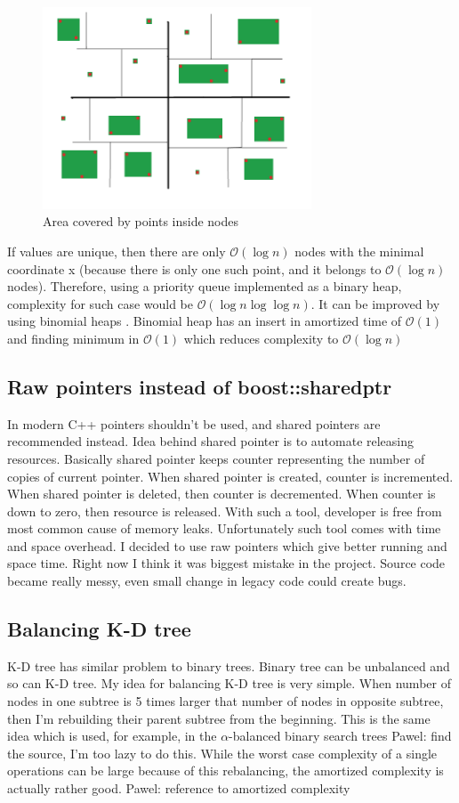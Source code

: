 \documentclass[10pt,a4paper]{article}
\newcommand{\pawel}[1]{\noindent\colorbox{myRed}{Pawel: #1}}
\newcommand{\Oh}{\mathcal{O}}
\begin{document}
\begin{figure}
\centering
  \includegraphics[width=8cm]{simple_boundary2.png}%
  \caption{Area covered by points inside nodes}
  \label{fig:inside}
\end{figure}

If values are unique, then there are only $\Oh(\log n)$ nodes with the minimal coordinate x (because there is only one such point, and it belongs to $\Oh(\log n)$ nodes). Therefore, using a priority queue implemented as a binary heap, complexity for such case would be $\Oh(\log n \log \log n)$. It can be improved by using binomial heaps \cite{BINOMHEAPS} . Binomial heap has an insert in amortized time of $\Oh(1)$ and finding minimum in $\Oh(1)$ which reduces complexity to $\Oh(\log n)$

\subsection{Raw pointers instead of boost::shared\textunderscore ptr}

In modern C++ pointers shouldn't be used, and shared pointers are recommended instead. Idea behind shared pointer is to automate releasing resources. Basically shared pointer keeps counter representing the number of copies of current pointer. When shared pointer is created, counter is incremented. When shared pointer is deleted, then counter is decremented. When counter is down to zero, then resource is released. With such a tool, developer is free from most common cause of memory leaks. Unfortunately such tool comes with time and space overhead. I decided to use raw pointers which give better running and space time.
Right now I think it was biggest mistake in the project. Source code became really messy, even small change in legacy code could create bugs.

\subsection{Balancing K-D tree}
K-D tree has similar problem to binary trees. Binary tree can be unbalanced and so can K-D tree. My idea for balancing K-D tree is very simple. When number of nodes in one subtree is 5 times larger that number of nodes in opposite subtree, then I'm rebuilding their parent subtree from the beginning.
This is the same idea which is used, for example, in the $\alpha$-balanced binary search trees \pawel{find the source, I'm too lazy to do this}. While the worst case complexity of a single operations can be large because of this rebalancing, the amortized complexity is actually rather good. \pawel{reference to amortized complexity}
\end{document}
